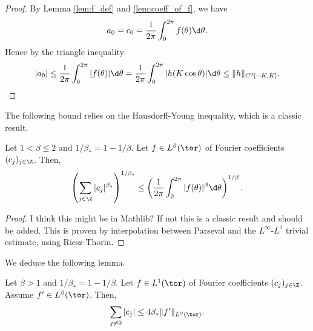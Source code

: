 \begin{proof}
  By Lemma \ref{lem:f_def} and \ref{lem:coeff_of_f}, we have
  \begin{equation*}
    a_0 = c_0 = \frac{1}{2 \pi} \int_0^{2 \pi} f(\theta) \d \theta.
  \end{equation*}
  Hence by the triangle inequality
  \begin{equation*}
    |a_0| \leq \frac{1}{2 \pi} \int_0^{2 \pi} |f(\theta)| \d \theta
    = \frac{1}{2 \pi} \int_0^{2 \pi} |h(K \cos \theta)| \d \theta
    \leq \| h \|_{C^0[-K,K]}.
  \end{equation*}
\end{proof}

The following bound relies on the Hausdorff-Young inequality, which is a classic result.

\begin{theorem}
  \label{thm:hausdorff_young}
  Let $1 < \beta \leq 2$ and $1/\beta_* = 1 - 1/\beta$.
  Let $f \in L^\beta(\tor)$ of Fourier coefficients $(c_j)_{j \in \Z}$.
  Then,
  \begin{equation*}
    \left(\sum_{j \in \Z} |c_j|^{\beta_*} \right)^{1/\beta_*}
    \leq \left(\frac{1}{2 \pi} \int_0^{2 \pi} |f(\theta)|^\beta \d \theta\right)^{1/\beta}.
  \end{equation*}
\end{theorem}

\begin{proof}
  I think this might be in Mathlib? If not this is a classic result and should be added.
  This is proven by interpolation between Parseval and the $L^\infty$-$L^1$ trivial estimate,
  using Riesz-Thorin.
\end{proof}

We deduce the following lemma.

\begin{lemma}
  \label{lem:Zygmund}
  Let $\beta > 1$ and $1/\beta_* = 1-1/\beta$.
  Let $f \in L^1(\tor)$ of Fourier coefficients $(c_j)_{j \in \Z}$.
  Assume $f' \in L^\beta(\tor)$.
  Then,
  \begin{equation*}
    \sum_{j \neq 0} |c_j| \leq 4 \beta_* \|f' \|_{L^\beta(\tor)}.
  \end{equation*}
\end{lemma}

